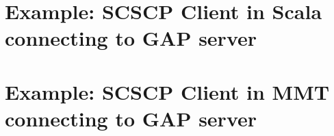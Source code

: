 \documentclass{deliverablereport}
\begin{document}
\section{Example: SCSCP Client in Scala connecting to GAP server}
\label{mmt-simple-example-SCSCP}


\section{Example: SCSCP Client in MMT connecting to GAP server}
\label{mmt-adv-example-SCSCP}

\end{document}
